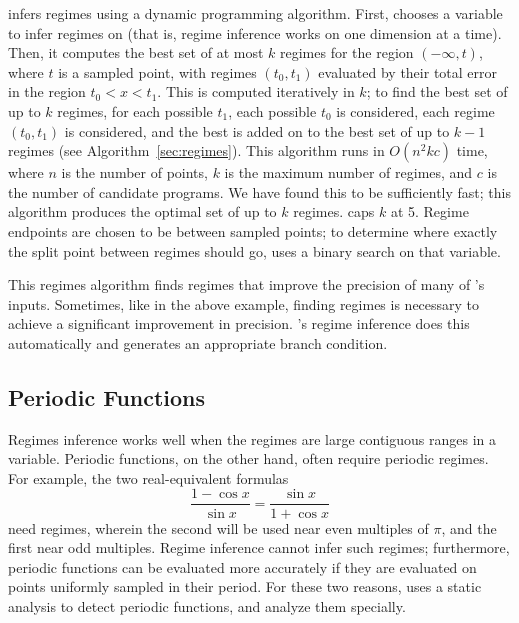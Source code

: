 \documentclass[paper.tex]{subfiles}
\begin{document}
\casio infers regimes using a dynamic programming algorithm.
First, \casio chooses a variable to infer regimes on
  (that is, regime inference works on one dimension at a time).
Then, it computes the best set of at most $k$ regimes
  for the region $(-\infty, t)$, where $t$ is a sampled point,
  with regimes $(t_0, t_1)$ evaluated by their total error
  in the region $t_0 < x < t_1$.
This is computed iteratively in $k$;
  to find the best set of up to $k$ regimes,
  for each possible $t_1$, each possible $t_0$ is considered,
  each regime $(t_0, t_1)$ is considered,
  and the best is added on to the best set of up to $k-1$ regimes
  (see Algorithm~\ref{sec:regimes}).
This algorithm runs in $O(n^2 k c)$ time,
  where $n$ is the number of points,
  $k$ is the maximum number of regimes,
  and $c$ is the number of candidate programs.
We have found this to be sufficiently fast;
  this algorithm produces the optimal set of up to $k$ regimes.
\casio caps $k$ at 5.
Regime endpoints are chosen to be between sampled points;
  to determine where exactly the split point between regimes should go,
  \casio uses a binary search on that variable.

This regimes algorithm finds regimes that improve
  the precision of many of \casio's inputs.
Sometimes, like in the above example,
  finding regimes is necessary to achieve
  a significant improvement in precision.
\casio's regime inference does this automatically
  and generates an appropriate branch condition.

\subsection{Periodic Functions}

Regimes inference works well when the regimes
  are large contiguous ranges in a variable.
Periodic functions, on the other hand, often require periodic regimes.
For example, the two real-equivalent formulas
\[
\frac{1 - \cos x}{\sin x} = \frac{\sin x}{1 + \cos x}
\]
  need regimes, wherein the second will be used
  near even multiples of $\pi$, and the first near odd multiples.
Regime inference cannot infer such regimes; furthermore,
  periodic functions can be evaluated more accurately
  if they are evaluated on points uniformly sampled in their period.
For these two reasons, \casio uses a static analysis
  to detect periodic functions, and analyze them specially.
\end{document}
